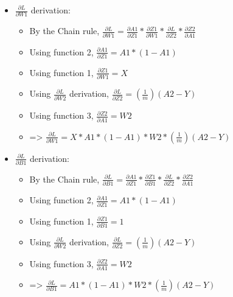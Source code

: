 \documentclass[10pt,a4paper]{article}
\begin{document}
\begin{itemize}
    \item $$ derivation:
    \begin{itemize}
        \item By the Chain rule, $ =  *  *  * $
        \item Using function 2, $ = A1 * (1-A1)$
        \item Using function 1, $ = X$
        \item Using $$ derivation, $ = ()(A2 - Y)$
        \item Using function 3, $ = W2$
        \item => $ = X * A1 * (1-A1) * W2 * ()(A2-Y)$
    \end{itemize}
    \item $$ derivation:
    \begin{itemize}
        \item By the Chain rule, $ =  *  *  * $
        \item Using function 2, $ = A1 * (1-A1)$
        \item Using function 1, $ = 1$
        \item Using $$ derivation, $ = ()(A2 - Y)$
        \item Using function 3, $ = W2$
        \item => $ = A1 * (1-A1) * W2 * ()(A2-Y)$
    \end{itemize}
\end{itemize}
\end{document}
